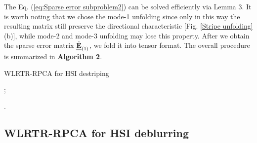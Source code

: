 \documentclass[twocolumn]{svjour3}          %
\begin{document}
    The Eq. (\ref{eq:Sparse error subproblem2}) can be solved efficiently via Lemma 3. It is worth noting that we chose the mode-1 unfolding since only in this way the resulting matrix still preserve the directional characteristic [Fig. \ref{Stripe unfolding}(b)], while mode-2 and mode-3 unfolding may lose this property. After we obtain the sparse error matrix ${\hat{\textbf{\emph{E}}}_{(1)}}$, we fold it into tensor format. The overall procedure is summarized in \textbf{Algorithm 2}.

\begin{algorithm}[tbp]
\caption{WLRTR-RPCA for HSI destriping}
     \begin{algorithmic}[1]\label{alg:algo2}
           ;
          \EndFor
          \EndProcedure
     \end{algorithmic}
.
\end{algorithm}

  \subsection{WLRTR-RPCA for HSI deblurring}
\end{document}
